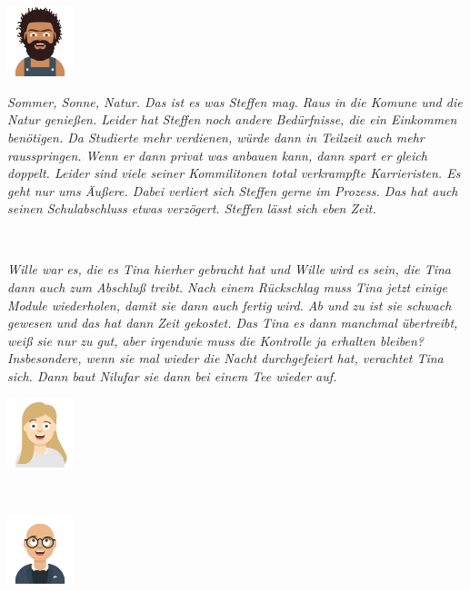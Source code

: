 \documentclass[a4paper, 9pt]{scrartcl}\usepackage[]{graphicx}\usepackage[]{xcolor}
\begin{document}
\begin{minipage}[c]{0.125\textwidth}
\includegraphics[width = 1.9cm]{avatare/Steffen}
\end{minipage}
\begin{minipage}[c]{0.875\textwidth}
\textit{Sommer, Sonne, Natur. Das ist es was Steffen mag. Raus in die Komune und die Natur genießen. Leider hat Steffen noch andere Bedürfnisse, die ein Einkommen benötigen. Da Studierte mehr verdienen, würde dann in Teilzeit auch mehr rausspringen. Wenn er dann privat was anbauen kann, dann spart er gleich doppelt. Leider sind viele seiner Kommilitonen total verkrampfte Karrieristen. Es geht nur ums Äußere. Dabei verliert sich Steffen gerne im Prozess. Das hat auch seinen Schulabschluss etwas verzögert. Steffen lässt sich eben Zeit.}
\end{minipage}\\[2.75Ex]
\begin{minipage}[c]{0.875\textwidth}
\textit{Wille  war es, die es Tina hierher gebracht hat und Wille wird es sein, die Tina dann auch zum Abschluß treibt. Nach einem Rückschlag muss Tina jetzt einige Module wiederholen, damit sie dann auch fertig wird. Ab und zu ist sie schwach gewesen und das hat dann Zeit gekostet. Das Tina es dann manchmal übertreibt, weiß sie nur zu gut, aber irgendwie muss die Kontrolle ja erhalten bleiben? Insbesondere, wenn sie mal wieder die Nacht durchgefeiert hat, verachtet Tina sich. Dann baut Nilufar sie dann bei einem Tee wieder auf.}
\end{minipage}
\begin{minipage}[c]{0.125\textwidth}
\includegraphics[width = 1.9cm]{avatare/Tina}
\end{minipage}\\[2.75Ex]
\begin{minipage}[c]{0.125\textwidth}
\includegraphics[width = 1.9cm]{avatare/Yuki}
\end{minipage}
\end{document}
